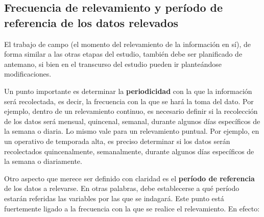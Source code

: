 \documentclass[
]{book}
\begin{document}
\hypertarget{frecuencia-de-relevamiento-y-peruxedodo-de-referencia-de-los-datos-relevados}{%
\subsection{Frecuencia de relevamiento y período de referencia de los datos relevados}\label{frecuencia-de-relevamiento-y-peruxedodo-de-referencia-de-los-datos-relevados}}

El trabajo de campo (el momento del relevamiento de la información en sí), de forma similar a las otras etapas del estudio, también debe ser planificado de antemano, si bien en el transcurso del estudio pueden ir planteándose modificaciones.

Un punto importante es determinar la \textbf{periodicidad} con la que la información será recolectada, es decir, la frecuencia con la que se hará la toma del dato. Por ejemplo, dentro de un relevamiento continuo, es necesario definir si la recolección de los datos será mensual, quincenal, semanal, durante algunos días específicos de la semana o diaria. Lo mismo vale para un relevamiento puntual. Por ejemplo, en un operativo de temporada alta, es preciso determinar si los datos serán recolectados quincenalmente, semanalmente, durante algunos días específicos de la semana o diariamente.

Otro aspecto que merece ser definido con claridad es el \textbf{período de referencia} de los datos a relevarse. En otras palabras, debe establecerse a qué período estarán referidas las variables por las que se indagará. Este punto está fuertemente ligado a la frecuencia con la que se realice el relevamiento. En efecto:
\end{document}
